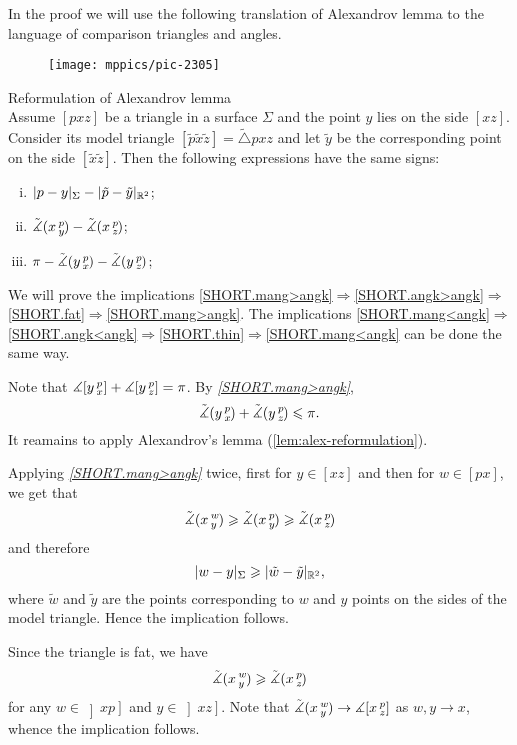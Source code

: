 In the proof we will use the following translation of Alexandrov lemma to the language of comparison triangles and angles.

\begin{wrapfigure}{r}{25mm}
\vskip-0mm
\centering
\texttt{[image: mppics/pic-2305]}
\end{wrapfigure}

\begin{thm}{Reformulation of Alexandrov lemma}\label{lem:alex-reformulation}\\
Assume $[pxz]$ be a triangle in a surface $\Sigma$ and 
the point $y$ lies on the side $[xz]$.
Consider its model triangle $[\tilde p\tilde x\tilde z]=\tilde\triangle pxz$ and let $\tilde y$ be the corresponding point on the side $[\tilde x\tilde z]$.
Then the following expressions have the same signs:
\begin{enumerate}[(i)]
 \item $|p-y|_\Sigma-|\tilde p-\tilde y|_{\mathbb{R}^2}$;
 \item $\tilde\measuredangle(x\,{}^{p}_{y}\hspace{-0.2ex})-\tilde\measuredangle(x\,{}^{p}_{z}\hspace{-0.2ex})$;
 \item $\pi-\tilde\measuredangle(y\,{}^{p}_{x}\hspace{-0.2ex})-\tilde\measuredangle(y\,{}^{p}_{z}\hspace{-0.2ex})$;
\end{enumerate}
\end{thm}

 We will prove the implications \ref{SHORT.mang>angk}$\Rightarrow$\ref{SHORT.angk>angk}$\Rightarrow$\ref{SHORT.fat}$\Rightarrow$\ref{SHORT.mang>angk}.
The implications \ref{SHORT.mang<angk}$\Rightarrow$\ref{SHORT.angk<angk}$\Rightarrow$\ref{SHORT.thin}$\Rightarrow$\ref{SHORT.mang<angk} can be done the same way.

Note that $\measuredangle[y\,{}^{p}_{x}]+\measuredangle[y\,{}^{p}_{z}]=\pi$.
By \textit{\ref{SHORT.mang>angk}}, 
\[\tilde\measuredangle(y\,{}^{p}_{x}\hspace{-0.2ex})+\tilde\measuredangle(y\,{}^{p}_{z}\hspace{-0.2ex})\leqslant \pi.\]
It reamains to apply Alexandrov's lemma (\ref{lem:alex-reformulation}).


Applying \textit{\ref{SHORT.mang>angk}} twice, first for $y\in [xz]$ and then for $w\in [px]$, we get that
\[\tilde\measuredangle(x\,{}^{w}_{y}\hspace{-0.2ex}) \geqslant \tilde\measuredangle(x\,{}^{p}_{y}\hspace{-0.2ex}) \geqslant \tilde\measuredangle(x\,{}^{p}_{z}\hspace{-0.2ex})\]
and therefore
\[|w-y|_\Sigma\geqslant |\tilde w-\tilde y|_{\mathbb{R}^2},\]
where $\tilde w$ and $\tilde y$ are the points corresponding to $w$ and $y$ points on the sides of the model triangle. Hence the implication follows.

Since the triangle is fat, we have 
\[\tilde\measuredangle(x\,{}^{w}_{y}\hspace{-0.2ex}) \geqslant \tilde\measuredangle(x\,{}^{p}_{z}\hspace{-0.2ex})\]
for any $w\in \left]xp\right]$ and $y\in \left]xz\right]$.
Note that $\tilde\measuredangle(x\,{}^{w}_{y}\hspace{-0.2ex})\to \measuredangle[x\,{}^{p}_{z}]$ as $w,y\to x$, whence the implication follows.
\qeds

